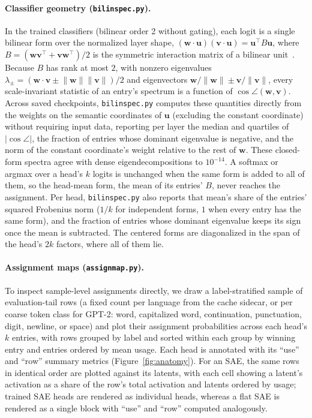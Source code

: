 \paragraph{Classifier geometry (\texttt{bilinspec.py}).}
In the trained classifiers (bilinear order 2 without gating), each logit is
a single bilinear form over the normalized layer shape,
$(\mathbf{w}\cdot\mathbf{u})(\mathbf{v}\cdot\mathbf{u}) =
\mathbf{u}^\top B\mathbf{u}$, where $B =
(\mathbf{w}\mathbf{v}^\top+\mathbf{v}\mathbf{w}^\top)/2$ is the symmetric
interaction matrix of a bilinear unit~\cite{pearce2025}. Because $B$ has
rank at most $2$, with nonzero eigenvalues $\lambda_\pm =
(\mathbf{w}\cdot\mathbf{v} \pm
\lVert\mathbf{w}\rVert\lVert\mathbf{v}\rVert)/2$ and eigenvectors
$\mathbf{w}/\lVert\mathbf{w}\rVert \pm \mathbf{v}/\lVert\mathbf{v}\rVert$,
every scale-invariant statistic of an entry's spectrum is a function of
$\cos\angle(\mathbf{w},\mathbf{v})$. Across saved checkpoints,
\texttt{bilinspec.py} computes these quantities directly from the weights
on the semantic coordinates of $\mathbf{u}$ (excluding the constant
coordinate) without requiring input data, reporting per layer the median
and quartiles of $\lvert\cos\angle\rvert$, the fraction of entries whose
dominant eigenvalue is negative, and the norm of the constant coordinate's
weight relative to the rest of $\mathbf{w}$. These closed-form spectra
agree with dense eigendecompositions to $10^{-14}$. A softmax or argmax
over a head's $k$ logits is unchanged when the same form is added to all of
them, so the head-mean form, the mean of its entries' $B$, never reaches
the assignment. Per head, \texttt{bilinspec.py} also reports that mean's
share of the entries' squared Frobenius norm ($1/k$ for independent forms,
$1$ when every entry has the same form), and the fraction of entries whose
dominant eigenvalue keeps its sign once the mean is subtracted. The
centered forms are diagonalized in the span of the head's $2k$ factors,
where all of them lie.

\paragraph{Assignment maps (\texttt{assignmap.py}).}
To inspect sample-level assignments directly, we draw a
label-stratified sample of evaluation-tail rows (a fixed count per language
from the cache sidecar, or per coarse token class for GPT-2: word,
capitalized word, continuation, punctuation, digit, newline, or space) and
plot their assignment probabilities across each head's $k$ entries, with
rows grouped by label and sorted within each group by winning entry and
entries ordered by mean usage. Each head is annotated with its ``use'' and
``row'' summary metrics (Figure~\ref{fig:anatomy}). For an SAE, the same
rows in identical order are plotted against its latents, with each cell
showing a latent's activation as a share of the row's total activation and
latents ordered by usage; trained SAE heads are rendered as individual
heads, whereas a flat SAE is rendered as a single block with ``use'' and
``row'' computed analogously.

